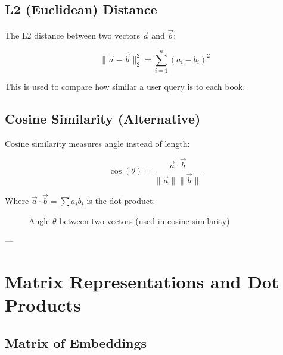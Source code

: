 \subsection*{L2 (Euclidean) Distance}

The L2 distance between two vectors $\vec{a}$ and $\vec{b}$:

\[
\|\vec{a} - \vec{b}\|_2^2 = \sum_{i=1}^{n} (a_i - b_i)^2
\]

This is used to compare how similar a user query is to each book.

\subsection*{Cosine Similarity (Alternative)}

Cosine similarity measures angle instead of length:

\[
\cos(\theta) = \frac{\vec{a} \cdot \vec{b}}{\|\vec{a}\| \|\vec{b}\|}
\]

Where $\vec{a} \cdot \vec{b} = \sum a_i b_i$ is the dot product.

\begin{figure}[H]
    \centering
    \caption{Angle $\theta$ between two vectors (used in cosine similarity)}
    \label{fig:cosine-angle}
\end{figure}

---

\section{Matrix Representations and Dot Products}
\label{sec:math-dotproduct}

\subsection*{Matrix of Embeddings}

